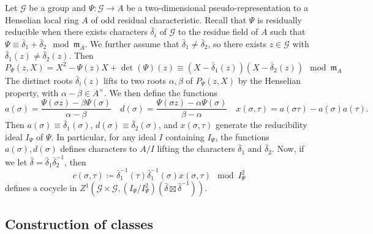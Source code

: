 \documentclass[leqno]{amsart}
\newcommand{\fm}{\mathfrak{m}}
\theoremstyle{definition}
\theoremstyle{remark}
\begin{document}
Let $\mathcal{G}$ be a group and 
$\Psi\colon \mathcal{G}\to A$
be a two-dimensional pseudo-representation
to a Henselian local ring $A$
of odd residual characteristic.
Recall that 
$\Psi$ is residually reducible
when there exists characters
$ \bar{\delta}_i$ of $\mathcal{G}$
to the residue field of  $A$
such that  
$\Psi\equiv \bar{\delta}_1+\bar{\delta}_2\mod \fm_A$.
We further assume that $\bar{\delta}_1\neq \bar{\delta}_2$,
so there exists $z\in \mathcal{G}$
with  $\bar{\delta}_1(z)\neq \bar{\delta}_2(z)$.
Then
\begin{equation}
    P_\Psi(z,X)=
    X^2-\Psi(z)X+\det(\Psi)(z) \equiv 
    (X-\bar{\delta}_1(z))(X-\bar{\delta}_2(z))
    \mod \fm_A
\end{equation}
The distinct roots $\bar{\delta}_i(z)$
lifts to two roots $\alpha,\beta$ of  $P_\Psi(z,X)$
by the Henselian property,
with $\alpha-\beta\in A^\times$.
We then define the functions
\begin{equation}
   a(\sigma)=
   \frac{\Psi(\sigma z)-\beta\Psi(\sigma)}{\alpha-\beta}\quad
   d(\sigma)=
   \frac{\Psi(\sigma z)-\alpha\Psi(\sigma)}{\beta-\alpha}\quad
   x(\sigma,\tau)=a(\sigma\tau)-a(\sigma)a(\tau).
\end{equation}
Then 
$a(\sigma)\equiv \bar{\delta}_1(\sigma)$,
$d(\sigma)\equiv \bar{\delta}_2(\sigma)$,
and $x(\sigma,\tau)$
generate the reducibility ideal
$I_\Psi$ of  $\Psi$.
In particular,
for any ideal $I$ containing $I_\Psi$,
the functions $a(\sigma),d(\sigma)$
defines characters to  $A/I$
lifting the characters
$\bar{\delta}_1$ and $\bar{\delta}_2$.
Now, if we let
$\bar{\delta}=\bar{\delta}_1\bar{\delta}_2^{-1}$, then
\begin{equation*}
    c(\sigma,\tau)\coloneqq \bar{\delta}_1^{-1}(\tau)
    \bar{\delta}_1^{-1}(\sigma)x(\sigma, \tau)\mod I_\Psi^2
\end{equation*}
defines a cocycle in 
$Z^1(\mathcal{G}\times \mathcal{G}, 
(I_\Psi/I_\Psi^2)(\bar{\delta}\boxtimes \bar{\delta}^{-1}))$.


\subsection{Construction of classes}
\end{document}
